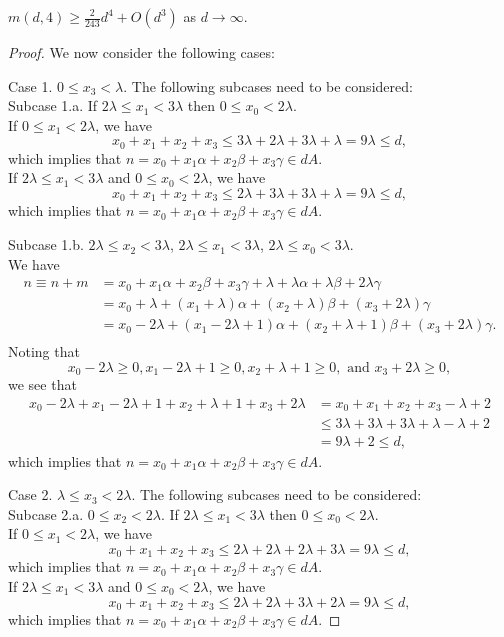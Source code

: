 \begin{theorem}
$\displaystyle m(d,4) \geq \frac{2}{243}d^4 + O(d^3)$  as $ d \to \infty$.
\end{theorem}

\begin{proof}
We now consider the following cases:

Case 1. $0 \leq x_3 < \lambda$. The following subcases need to be considered:\\
Subcase 1.a. If $2 \lambda \leq x_1 < 3 \lambda$ then $0 \leq x_0 < 2\lambda$. \\
If $0 \leq x_1 < 2 \lambda$, we have 
\[ x_0 + x_1 + x_2 + x_3 \leq 3\lambda + 2\lambda + 3\lambda + \lambda = 9\lambda \leq d, \]
which implies that $n = x_0 + x_1\alpha + x_2\beta + x_3\gamma \in dA$. \\
If $2 \lambda \leq x_1 < 3 \lambda$ and  $0 \leq x_0 < 2\lambda$, we have 
\[ x_0 + x_1 + x_2 + x_3 \leq 2\lambda + 3\lambda + 3\lambda + \lambda = 9\lambda \leq d, \]
which implies that $n = x_0 + x_1\alpha + x_2\beta + x_3\gamma \in dA$. 

Subcase 1.b. $2 \lambda \leq x_2 < 3 \lambda$, $2 \lambda \leq x_1 < 3\lambda$, $2 \lambda \leq x_0 < 3\lambda$. \\
We have
\begin{align*}
n \equiv n + m &= x_0 + x_1\alpha + x_2\beta + x_3\gamma + \lambda + \lambda \alpha + \lambda \beta + 2 \lambda \gamma\\
&=  x_0 + \lambda + (x_1 + \lambda) \alpha + (x_2 + \lambda) \beta + (x_3 + 2 \lambda) \gamma\\ 
&=  x_0 -  2\lambda + (x_1 - 2 \lambda + 1) \alpha + (x_2 + \lambda + 1) \beta + (x_3 + 2 \lambda)
 \gamma.\\ 
\end{align*}
Noting that
\[  x_0 -  2\lambda \geq 0, x_1 - 2 \lambda + 1 \geq 0, x_2 + \lambda + 1 \geq 0, \text{ and } x_3 + 2 \lambda \geq 0, \]
we see that 
\begin{align*}
x_0 -  2\lambda + x_1 - 2 \lambda + 1 + x_2 + \lambda + 1 + x_3 + 2 \lambda &= x_0  + x_1 +  x_2 + x_3 -  \lambda + 2 \\
&\leq 3 \lambda + 3 \lambda + 3 \lambda + \lambda - \lambda + 2\\
&= 9 \lambda + 2 \leq d,
\end{align*}
which implies that $n = x_0 + x_1\alpha + x_2\beta + x_3\gamma \in dA$. 

Case 2. $\lambda \leq x_3 < 2\lambda$. The following subcases need to be considered:\\
Subcase 2.a. $0 \leq x_2 < 2 \lambda.$ If $2 \lambda \leq x_1 < 3 \lambda$ then $0 \leq x_0 < 2\lambda$. \\
If $0 \leq x_1 < 2 \lambda$, we have 
\[ x_0 + x_1 + x_2 + x_3 \leq 2\lambda + 2\lambda + 2\lambda + 3\lambda = 9\lambda \leq d, \]
which implies that $n = x_0 + x_1\alpha + x_2\beta + x_3\gamma \in dA$. \\
If $2 \lambda \leq x_1 < 3 \lambda$ and  $0 \leq x_0 < 2\lambda$, we have 
\[ x_0 + x_1 + x_2 + x_3 \leq 2\lambda + 2\lambda + 3\lambda + 2 \lambda = 9\lambda \leq d, \]
which implies that $n = x_0 + x_1\alpha + x_2\beta + x_3\gamma \in dA$. 


\end{proof}
